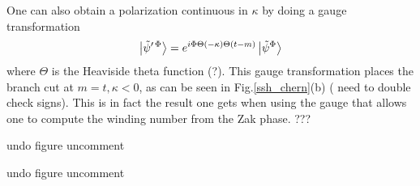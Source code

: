 \documentclass[twocolumn,amsmath,longbibliography,amssymb,superscriptaddress]{revtex4-1}
\newcommand{\carlos}[1]{{\color{red} #1}}
\newcommand{\maria}[1]{{\color{blue} #1}}
\newcommand{\changed}[1]{{\color{orange}#1}}
\begin{document}
One can also obtain a polarization continuous in $\kappa$ by doing a gauge transformation 
\begin{align}
\ket{\tilde{\psi}^{\prime \,\Phi}}=e^{ i \Phi \Theta(-\kappa)\Theta(t-m)}\ket{\tilde{\psi}^{\Phi}}
\end{align}
\maria{where $\Theta$ is the Heaviside theta function (?)}. 
This gauge transformation places the branch cut at $m=t,\kappa < 0$, as can be seen in Fig.\ref{ssh_chern}(b)  (\carlos{need to double check signs}). 
This is in fact the result one gets when using the gauge that allows one to compute the winding number from the Zak phase. \maria{???}

\changed{undo figure uncomment}
%	

\changed{undo figure uncomment}
%
%	
\end{document}
